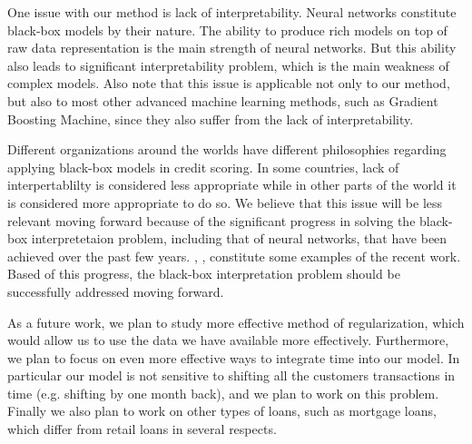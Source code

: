 \documentclass[sigconf]{acmart}
\begin{document}
One issue with our method is lack of interpretability. Neural networks constitute black-box models by their nature. The ability to produce rich models on top of raw data representation is the main strength of neural networks. But this ability also leads to significant interpretability problem, which is the main weakness of complex models. Also note that this issue is applicable not only to our method, but also to most other advanced machine learning methods, such as  Gradient Boosting Machine, since they also suffer from the lack of interpretability.

Different organizations around the worlds have different philosophies regarding applying black-box models in credit scoring. In some countries, lack of interpertablilty is considered less appropriate while in other parts of the world it is considered more appropriate to do so. We believe that this issue will be less relevant moving forward because of the significant progress in solving the black-box interpretetaion problem, including that of neural networks, that have been achieved over the past few years. \cite{DBLP:journals/corr/ChoiBSSS16}, \cite{gupta2018lisa}, \cite{mccoy2018rnns} constitute some examples of the recent work. Based of this progress, the black-box interpretation problem should be successfully addressed moving forward.

As a future work, we plan to study more effective method of regularization, which would allow us to use the data we have available more effectively.
Furthermore, we plan to focus on even more effective ways to integrate time into our model. In particular our model is not sensitive to shifting all the customers transactions in time (e.g. shifting by one month back), and we plan to work on this problem.
Finally we also plan to work on other types of loans, such as mortgage loans, which differ from retail loans in several respects.



\end{document}
